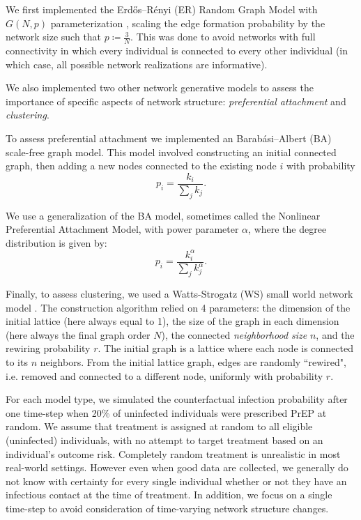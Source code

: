 \documentclass{article}
\theoremstyle{definition}
\begin{document}
We first implemented the  Erdős–Rényi (ER) Random Graph Model with $G(N,p)$ parameterization \cite{barabasi_network_2016}, scaling the edge formation probability by the network size such that $p \coloneqq \frac{3}{N}$. This was done to avoid networks with full connectivity in which every individual is connected to every other individual (in which case, all possible network realizations are informative). 

We also implemented two other network generative models to assess the importance of specific aspects of network structure: \textit{preferential attachment} and \textit{clustering}. 

To assess preferential attachment we implemented an Barabási–Albert (BA) scale-free graph model\cite{barabasi_network_2016}. This model involved constructing an initial connected graph, then adding a new nodes connected to the existing node $i$ with probability 
\begin{equation*}
    p_{i}=\frac{k_{i}}{\sum_{j}k_{j}}.
\end{equation*}

We use a generalization of the BA model, sometimes called the Nonlinear Preferential Attachment Model, with power parameter $\alpha$, where the degree distribution is given by:
\begin{equation*}
    p_{i}=\frac{k_{i}^{\alpha}}{\sum_{j}k_{j}^{\alpha}}.
\end{equation*}

Finally, to assess clustering, we used a Watts-Strogatz (WS) small world network model \cite{barabasi_network_2016}. The construction algorithm relied on 4 parameters: the dimension of the initial lattice (here always equal to 1), the size of the graph in each dimension (here always the final graph order $N$), the connected \textit{neighborhood size} $n$, and the rewiring probability $r$. The initial graph is a lattice where each node is connected to its $n$ neighbors. From the initial lattice graph, edges are randomly ``rewired", i.e. removed and connected to a different node, uniformly with probability $r$.

For each model type, we simulated the counterfactual infection probability after one time-step when 20\% of uninfected individuals were prescribed PrEP at random. We assume that treatment is assigned at random to all eligible (uninfected) individuals, with no attempt to target treatment based on an individual's outcome risk. Completely random treatment is unrealistic in most real-world settings. However even when good data are collected, we generally do not know with certainty for every single individual whether or not they have an infectious contact at the time of treatment. In addition, we focus on a single time-step to avoid consideration of time-varying network structure changes.
\end{document}
